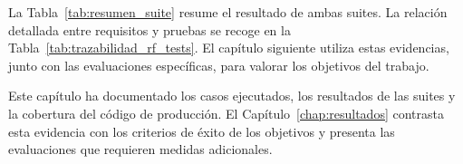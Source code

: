 La Tabla~\ref{tab:resumen_suite} resume el resultado de ambas suites. 
La relación detallada entre requisitos y pruebas se recoge en la
Tabla~\ref{tab:trazabilidad_rf_tests}. El capítulo siguiente utiliza estas
evidencias, junto con las evaluaciones específicas, para valorar los objetivos
del trabajo.


Este capítulo ha documentado los casos ejecutados, los resultados de las
suites y la cobertura del código de producción. El
Capítulo~\ref{chap:resultados} contrasta esta evidencia con los criterios de
éxito de los objetivos y presenta las evaluaciones que requieren medidas
adicionales.
